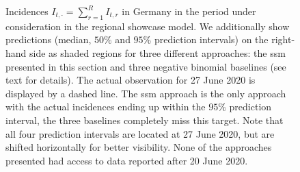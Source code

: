 \begin{figure}
   \resizebox{\textwidth}{!}{%
        
}
    \caption{Incidences $I_{t,\cdot} = \sum_{r = 1}^R I_{t,r}$ in Germany in the period under consideration in the regional showcase model. We additionally show predictions (median, $50\%$ and $95\%$ prediction intervals) on the right-hand side as shaded regions for three different approaches: the \gls{ssm} presented in this section and three negative binomial baselines (see text for details). The actual observation for 27 June 2020 is displayed by a dashed line. The \gls{ssm} approach is the only approach with the actual incidences ending up within the $95\%$ prediction interval, the three baselines completely miss this target. Note that all four prediction intervals are located at 27 June 2020, but are shifted horizontally for better visibility. None of the approaches presented had access to data reported after 20 June 2020.}
    \label{fig:regional_showcase_prediction}
\end{figure}
